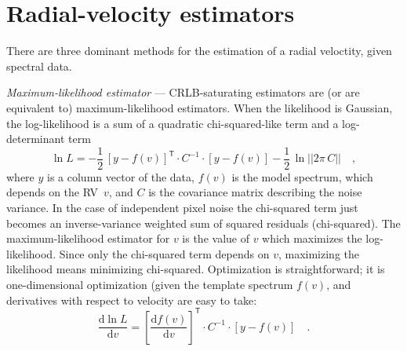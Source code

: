 \documentclass[modern]{aastex63}
\newcommand{\dd}{\mathrm{d}}
\newcommand{\T}{^{\mathsf{T}}}
\renewcommand{\paragraph}[1]{\bigskip\par\noindent\textsl{#1} ---}
\newcommand{\acronym}[1]{{\small{#1}}}
\newcommand{\RV}{\acronym{RV}}
\newcommand{\CRLB}{\acronym{CRLB}}
\begin{document}
\section{Radial-velocity estimators}
\label{s:methods}

There are three dominant methods for the estimation of a radial veloctity,
given spectral data.

\paragraph{Maximum-likelihood estimator}
\CRLB-saturating estimators are (or are equivalent to)
maximum-likelihood estimators.
When the likelihood is Gaussian, the log-likelihood
is a sum of a quadratic chi-squared-like term and a log-determinant term
\begin{equation}
\ln L = -\frac{1}{2}\,[y - f(v)]\T\cdot C^{-1}\cdot [y - f(v)] - \frac{1}{2}\,\ln||2\pi\,C||
\quad ,
\label{eq:lf}
\end{equation}
where $y$ is a column vector of the data, $f(v)$ is the model spectrum,
which depends on the \RV\ $v$,
and $C$ is the covariance matrix describing the noise variance.
In the case of independent pixel noise the chi-squared term just becomes an
inverse-variance weighted sum of squared residuals (chi-squared).
The maximum-likelihood estimator for $v$ is the value of $v$ which maximizes
the log-likelihood.
Since only the chi-squared term depends on $v$, maximizing the likelihood
means minimizing chi-squared.
Optimization is straightforward; it is one-dimensional optimization
(given the template spectrum $f(v)$, and derivatives with respect to
velocity are easy to take:
\begin{equation}
\frac{\dd\ln L}{\dd v} = [\frac{\dd f(v)}{\dd v}]\T\cdot C^{-1}\cdot [y - f(v)]
\quad .
\label{eq:dldv}
\end{equation}
\end{document}
